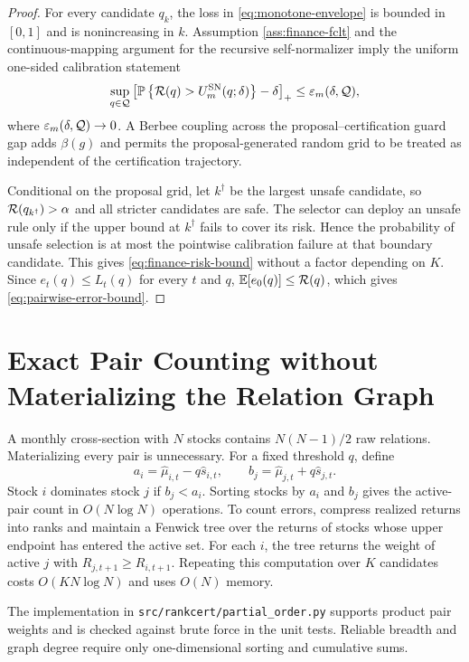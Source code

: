 \begin{proof}
For every candidate $q_k$, the loss in \eqref{eq:monotone-envelope} is bounded in $[0,1]$ and is nonincreasing in $k$. Assumption \ref{ass:finance-fclt} and the continuous-mapping argument for the recursive self-normalizer imply the uniform one-sided calibration statement
\[
\sup_{q\in\mathcal Q}
\left[
\mathbb P\left\{
\mathcal R(q)>U_m^{\mathrm{SN}}(q;\delta)
\right\}
-
\delta
\right]_+
\leq
\varepsilon_m(\delta,\mathcal Q),
\]
where $\varepsilon_m(\delta,\mathcal Q)\to0$. A Berbee coupling across the proposal--certification guard gap adds $\beta(g)$ and permits the proposal-generated random grid to be treated as independent of the certification trajectory.

Conditional on the proposal grid, let $k^\dagger$ be the largest unsafe candidate, so $\mathcal R(q_{k^\dagger})>\alpha$ and all stricter candidates are safe. The selector can deploy an unsafe rule only if the upper bound at $k^\dagger$ fails to cover its risk. Hence the probability of unsafe selection is at most the pointwise calibration failure at that boundary candidate. This gives \eqref{eq:finance-risk-bound} without a factor depending on $K$. Since $e_t(q)\leq L_t(q)$ for every $t$ and $q$, $\mathbb E[e_0(q)]\leq\mathcal R(q)$, which gives \eqref{eq:pairwise-error-bound}.
\end{proof}

\section{Exact Pair Counting without Materializing the Relation Graph}

A monthly cross-section with $N$ stocks contains $N(N-1)/2$ raw relations. Materializing every pair is unnecessary. For a fixed threshold $q$, define
\[
a_i
=
\widehat\mu_{i,t}-q\widehat s_{i,t},
\qquad
b_j
=
\widehat\mu_{j,t}+q\widehat s_{j,t}.
\]
Stock $i$ dominates stock $j$ if $b_j<a_i$. Sorting stocks by $a_i$ and $b_j$ gives the active-pair count in $O(N\log N)$ operations. To count errors, compress realized returns into ranks and maintain a Fenwick tree over the returns of stocks whose upper endpoint has entered the active set. For each $i$, the tree returns the weight of active $j$ with $R_{j,t+1}\geq R_{i,t+1}$. Repeating this computation over $K$ candidates costs $O(KN\log N)$ and uses $O(N)$ memory.

The implementation in \texttt{src/rankcert/partial\_order.py} supports product pair weights and is checked against brute force in the unit tests. Reliable breadth and graph degree require only one-dimensional sorting and cumulative sums.

